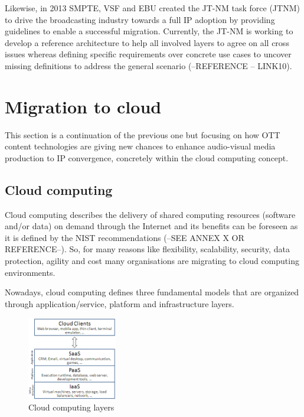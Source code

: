 Likewise, in 2013 SMPTE, VSF and EBU created the JT-NM task force (JTNM) to drive the broadcasting industry towards a full IP adoption by providing guidelines to enable a successful migration. Currently, the JT-NM is working to develop a reference architecture to help all involved layers to agree on all cross issues whereas defining specific requirements over concrete use cases to uncover missing definitions to address the general scenario (--REFERENCE -- LINK10).

\section{Migration to cloud}

This section is a continuation of the previous one but focusing on how OTT content technologies are giving new chances to enhance audio-visual media production to IP convergence, concretely within the cloud computing concept. 

\subsection{Cloud computing}

Cloud computing describes the delivery of shared computing resources (software and/or data) on demand through the Internet and its benefits can be foreseen as it is defined by the NIST recommendations (--SEE ANNEX X OR REFERENCE--). So, for many reasons like flexibility, scalability, security, data protection, agility and cost many organisations are migrating to cloud computing environments. 

Nowadays, cloud computing defines three fundamental models that are organized through application/service, platform and infrastructure layers.

\begin{figure}[htb]
\begin{center}
\includegraphics[width=0.35\textwidth]{./images/Cloud_computing_layers.png}
\caption{Cloud computing layers}
\label{F:cloudComputingLayers}
\end{center}
\end{figure}

